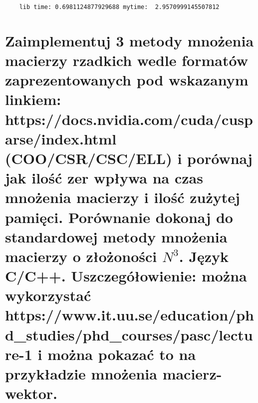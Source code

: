 \begin{lstlisting}
    lib time: 0.6981124877929688 mytime:  2.9570999145507812
\end{lstlisting}
\section{Zaimplementuj 3 metody mnożenia macierzy rzadkich wedle formatów zaprezentowanych pod wskazanym linkiem: https://docs.nvidia.com/cuda/cusparse/index.html (COO/CSR/CSC/ELL) i porównaj jak ilość zer wpływa na czas mnożenia macierzy i ilość zużytej pamięci. Porównanie dokonaj do standardowej metody mnożenia macierzy o złożoności $N^3$. Język C/C++. Uszczegółowienie: można wykorzystać https://www.it.uu.se/education/phd\_studies/phd\_courses/pasc/lecture-1 i można pokazać to na przykładzie mnożenia macierz-wektor.
}

